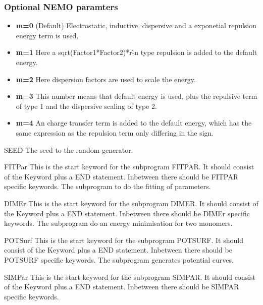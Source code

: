 \begin{keywordlist}
\subsubsection{Optional NEMO paramters}
\begin{itemize}
\itemsep 9pt plus 3pt minus 3pt
\item
{\bf m=0}
(Default) Electrostatic, inductive, dispersive and a exponetial repulsion energy term is used.
\item
{\bf m=1}
Here a sqrt(Factor1*Factor2)*r\^-n type repulsion is added to the default energy.
\item
{\bf m=2}
Here dispersion factors are used to scale the energy.
\item
{\bf m=3}
This number means that default energy is used, plus the repulsive term of type 1 and the dispersive scaling of type 2.
\item
{\bf m=4}
An charge transfer term is added to the default energy, which has the same expression
as the repulsion term only differing in the sign.
\end{itemize}
\item[SEED]
The seed to the random generator.
\item[FITPar]
This is the start keyword for the subprogram {\prgmfont FITPAR}. It should consist of the Keyword plus a END statement.
Inbetween there should be {\prgmfont FITPAR} specific keywords.
The subprogram to do the fitting of parameters.
\item[DIMEr]
This is the start keyword for the subprogram {\prgmfont DIMER}. It should consist of the Keyword plus a END statement.
Inbetween there should be {\prgmfont DIMEr} specific keywords.
The subprogram do an energy minimisation for two monomers.
\item[POTSurf]
This is the start keyword for the subprogram {\prgmfont POTSURF}. It should consist of the Keyword plus a END statement.
Inbetween there should be {\prgmfont POTSURF} specific keywords.
The subprogram generates potential curves.
\item[SIMPar]
This is the start keyword for the subprogram {\prgmfont SIMPAR}. It should consist of the Keyword plus a END statement.
Inbetween there should be {\prgmfont SIMPAR} specific keywords.
\end{keywordlist}
